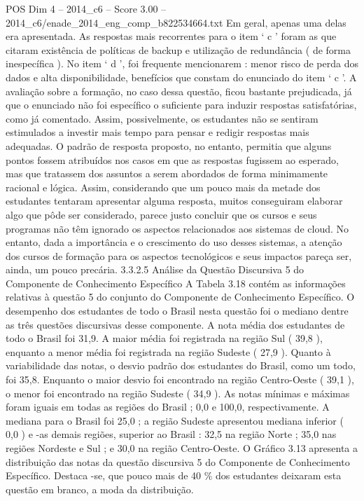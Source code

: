 \begin{textsample}{POS Dim 4 – 2014\_c6 – Score 3.00 – 2014\_c6/enade\_2014\_eng\_comp\_b822534664.txt}
Em geral, apenas uma delas era apresentada.
As respostas mais recorrentes para o item ‘ c ’ foram as que citaram existência de políticas de backup e utilização de redundância ( de forma inespecífica ).
No item ‘ d ’, foi frequente mencionarem : menor risco de perda dos dados e alta disponibilidade, benefícios que constam do enunciado do item ‘ c ’.
A avaliação sobre a formação, no caso dessa questão, ficou bastante prejudicada, já que o enunciado não foi específico o suficiente para induzir respostas satisfatórias, como já comentado.
Assim, possivelmente, os estudantes não se sentiram estimulados a investir mais tempo para pensar e redigir respostas mais adequadas.
O padrão de resposta proposto, no entanto, permitia que alguns pontos fossem atribuídos nos casos em que as respostas fugissem ao esperado, mas que tratassem dos assuntos a serem abordados de forma minimamente racional e lógica.
Assim, considerando que um pouco mais da metade dos estudantes tentaram apresentar alguma resposta, muitos conseguiram elaborar algo que pôde ser considerado, parece justo concluir que os cursos e seus programas não têm ignorado os aspectos relacionados aos sistemas de cloud.
No entanto, dada a importância e o crescimento do uso desses sistemas, a atenção dos cursos de formação para os aspectos tecnológicos e seus impactos pareça ser, ainda, um pouco precária. 3.3.2.5 Análise da Questão Discursiva 5 do Componente de Conhecimento Específico A Tabela 3.18 contém as informações relativas à questão 5 do conjunto do Componente de Conhecimento Específico.
O desempenho dos estudantes de todo o Brasil nesta questão foi o mediano dentre as três questões discursivas desse componente.
A nota média dos estudantes de todo o Brasil foi 31,9.
A maior média foi registrada na região Sul ( 39,8 ), enquanto a menor média foi registrada na região Sudeste ( 27,9 ).
Quanto à variabilidade das notas, o desvio padrão dos estudantes do Brasil, como um todo, foi 35,8.
Enquanto o maior desvio foi encontrado na região Centro-Oeste ( 39,1 ), o menor foi encontrado na região Sudeste ( 34,9 ).
As notas mínimas e máximas foram iguais em todas as regiões do Brasil ; 0,0 e 100,0, respectivamente.
A mediana para o Brasil foi 25,0 ; a região Sudeste apresentou mediana inferior ( 0,0 ) e -as demais regiões, superior ao Brasil : 32,5 na região Norte ; 35,0 nas regiões Nordeste e Sul ; e 30,0 na região Centro-Oeste.
O Gráfico 3.13 apresenta a distribuição das notas da questão discursiva 5 do Componente de Conhecimento Específico.
Destaca -se, que pouco mais de 40 \% dos estudantes deixaram esta questão em branco, a moda da distribuição.

\end{textsample}
